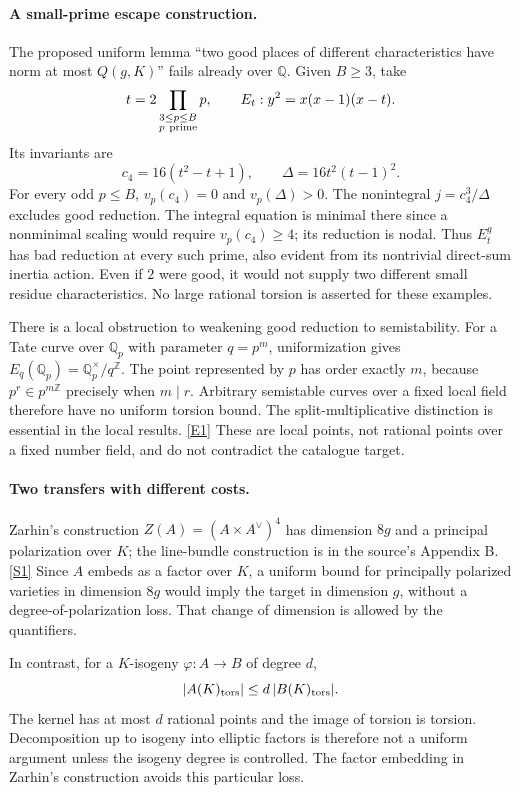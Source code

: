 \documentclass[11pt,a4paper]{article}
\newcommand{\Z}{\mathbb{Z}}
\newcommand{\Q}{\mathbb{Q}}
\newcommand{\sref}[2]{\hyperlink{source:#1:#2}{[S#2]}}
\newcommand{\eref}[2]{\hyperlink{extra:#1:#2}{[E#2]}}
\numberwithin{equation}{section}
\begin{document}
\paragraph{A small-prime escape construction.}
The proposed uniform lemma ``two good places of different characteristics
have norm at most $Q(g,K)$'' fails already over $\Q$. Given $B\ge3$, take
\[
 t=2\prod_{\substack{3\le p\le B\\p\ {\rm prime}}}p,
 \qquad E_t:y^2=x(x-1)(x-t).
\]
Its invariants are
\[
 c_4=16(t^2-t+1),\qquad \Delta=16t^2(t-1)^2.
\]
For every odd $p\le B$, $v_p(c_4)=0$ and $v_p(\Delta)>0$. The nonintegral
$j=c_4^3/\Delta$ excludes good reduction. The integral equation is minimal
there since a nonminimal scaling would require $v_p(c_4)\ge4$; its reduction
is nodal. Thus $E_t^g$ has bad reduction at every such prime, also evident
from its nontrivial direct-sum inertia action. Even if $2$ were good, it
would not supply two different small residue characteristics. No large
rational torsion is asserted for these examples.

There is a local obstruction to weakening good reduction to semistability.
For a Tate curve over $\Q_p$ with parameter $q=p^m$, uniformization gives
$E_q(\Q_p)=\Q_p^\times/q^{\Z}$. The point represented by $p$ has order exactly
$m$, because $p^r\in p^{m\Z}$ precisely when $m\mid r$. Arbitrary
semistable curves over a fixed local field therefore have no uniform torsion
bound. The split-multiplicative distinction is essential in the local
results. \eref{statement}{1} These are local points, not rational points over a
fixed number field, and do not contradict the catalogue target.

\paragraph{Two transfers with different costs.}
Zarhin's construction $Z(A)=(A\times A^\vee)^4$ has dimension $8g$ and a
principal polarization over $K$; the line-bundle construction is in the
source's Appendix B. \sref{statement}{1} Since $A$ embeds as a factor over $K$,
a uniform bound for principally polarized varieties in dimension $8g$
would imply the target in dimension $g$, without a degree-of-polarization
loss. That change of dimension is allowed by the quantifiers.

In contrast, for a $K$-isogeny $\varphi:A\to B$ of degree $d$,
\[
 |A(K)_{\rm tors}|\le d\,|B(K)_{\rm tors}|.
\]
The kernel has at most $d$ rational points and the image of torsion is
torsion. Decomposition up to isogeny into elliptic factors is therefore not
a uniform argument unless the isogeny degree is controlled. The factor
embedding in Zarhin's construction avoids this particular loss.
\end{document}
